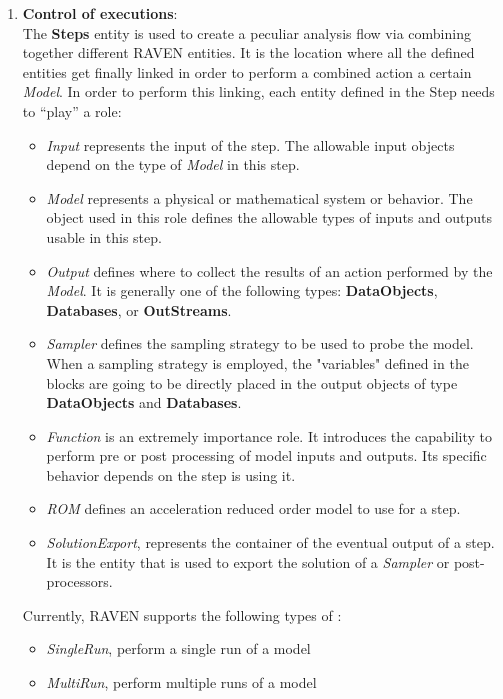 \begin{enumerate}
    \item \textbf{Control of executions}: 
      \\The \textbf{Steps} entity is used to create a peculiar analysis flow via combining together different RAVEN
      entities. It is the location where all the defined entities get finally linked in order to perform a combined
      action a certain \textit{Model}. In order to perform this linking, each entity defined in the Step needs to
      ``play'' a role:
      \begin{itemize}
        \item \textit{Input} represents the input of the step. The allowable input objects depend on the type
          of \textit{Model} in this step.
        \item \textit{Model} represents a physical or mathematical system or behavior. The object used in this role
          defines the allowable types of inputs and outputs usable in this step.
        \item \textit{Output} defines where to collect the results of an action performed by the \textit{Model}. It
          is generally one of the following types: \textbf{DataObjects}, \textbf{Databases}, or \textbf{OutStreams}.
        \item \textit{Sampler} defines the sampling strategy to be used to probe the model. \nb When a sampling
          strategy is employed, the "variables" defined in the  blocks are going to be directly
          placed in the output objects of type \textbf{DataObjects} and \textbf{Databases}.
        \item \textit{Function} is an extremely importance role. It introduces the capability to perform pre or post
          processing of model inputs and outputs. Its specific behavior depends on the step is using it.
        \item \textit{ROM} defines an acceleration reduced order model to use for a step.
        \item \textit{SolutionExport}, represents the container of the eventual output of a step. It is the entity
          that is used to export the solution of a \textit{Sampler} or post-processors.
      \end{itemize}
      Currently, RAVEN supports the following types of \textit{}:
      \begin{itemize}
        \item \textit{SingleRun}, perform a single run of a model
        \item \textit{MultiRun}, perform multiple runs of a model

\end{itemize}
\end{enumerate}
